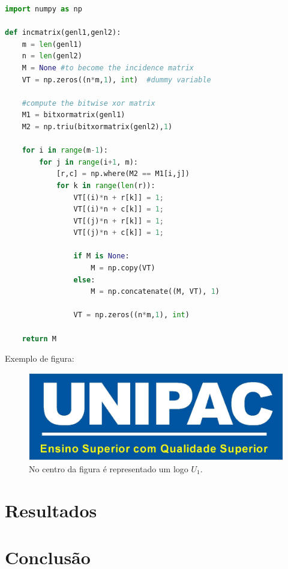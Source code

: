 \begin{lstlisting}[language=Python]
import numpy as np
 
def incmatrix(genl1,genl2):
    m = len(genl1)
    n = len(genl2)
    M = None #to become the incidence matrix
    VT = np.zeros((n*m,1), int)  #dummy variable
 
    #compute the bitwise xor matrix
    M1 = bitxormatrix(genl1)
    M2 = np.triu(bitxormatrix(genl2),1) 
 
    for i in range(m-1):
        for j in range(i+1, m):
            [r,c] = np.where(M2 == M1[i,j])
            for k in range(len(r)):
                VT[(i)*n + r[k]] = 1;
                VT[(i)*n + c[k]] = 1;
                VT[(j)*n + r[k]] = 1;
                VT[(j)*n + c[k]] = 1;
 
                if M is None:
                    M = np.copy(VT)
                else:
                    M = np.concatenate((M, VT), 1)
 
                VT = np.zeros((n*m,1), int)
 
    return M
\end{lstlisting}

Exemplo de figura:

\begin{figure}[htp]
	\centering
	\caption{\label{fig:met-disc-fig01} No centro da figura é representado um logo $U_1$.} 
	\includegraphics[width = 0.8\linewidth]{images/UNIPAC.jpg}
\end{figure}

\chapter{Resultados} \label{resultados}

\lipsum[11-12]

\chapter{Conclusão}

\lipsum[11-12]






